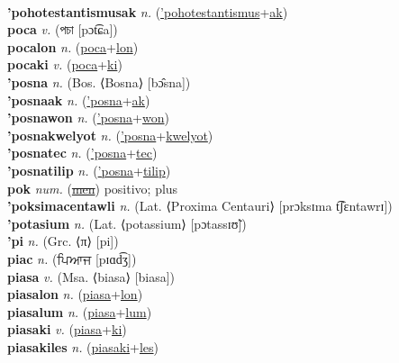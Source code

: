  \label{'pohotestantismuswon} \\
\textbf{'pohotestantismusak} \textit{n.} (\hyperref['pohotestantismus]{'pohotestantismus}+\hyperref[ak]{ak})
 \label{'pohotestantismusak} \\
\textbf{poca} \textit{v.} ({\bengali{}পচা} [pɔt͡ɕa])
 \label{poca} \\
\textbf{pocalon} \textit{n.} (\hyperref[poca]{poca}+\hyperref[lon]{lon})
 \label{pocalon} \\
\textbf{pocaki} \textit{v.} (\hyperref[poca]{poca}+\hyperref[ki]{ki})
 \label{pocaki} \\
\textbf{'posna} \textit{n.} (Bos. ⟨Bosna⟩ [bɔ̂sna])
 \label{'posna} \\
\textbf{'posnaak} \textit{n.} (\hyperref['posna]{'posna}+\hyperref[ak]{ak})
 \label{'posnaak} \\
\textbf{'posnawon} \textit{n.} (\hyperref['posna]{'posna}+\hyperref[won]{won})
 \label{'posnawon} \\
\textbf{'posnakwelyot} \textit{n.} (\hyperref['posna]{'posna}+\hyperref[kwelyot]{kwelyot})
 \label{'posnakwelyot} \\
\textbf{'posnatec} \textit{n.} (\hyperref['posna]{'posna}+\hyperref[tec]{tec})
 \label{'posnatec} \\
\textbf{'posnatilip} \textit{n.} (\hyperref['posna]{'posna}+\hyperref[tilip]{tilip})
 \label{'posnatilip} \\
\textbf{pok} \textit{num.} (\hyperref[men]{\sout{men}})
positivo; plus \label{pok} \\
\textbf{'poksimacentawli} \textit{n.} (Lat. ⟨Proxima Centauri⟩ [prɔksɪma t͡ʃɛntawrɪ])
 \label{'poksimacentawli} \\
\textbf{'potasium} \textit{n.} (Lat. ⟨potassium⟩ [pɔtassɪʊ̃])
 \label{'potasium} \\
\textbf{'pi} \textit{n.} (Grc. ⟨π⟩ [pi])
 \label{'pi} \\
\textbf{piac} \textit{n.} ({\gurmukhi{}ਪਿਆਜ} [pɪɑd͡ʒ])
 \label{piac} \\
\textbf{piasa} \textit{v.} (Msa. ⟨biasa⟩ [biasa])
 \label{piasa} \\
\textbf{piasalon} \textit{n.} (\hyperref[piasa]{piasa}+\hyperref[lon]{lon})
 \label{piasalon} \\
\textbf{piasalum} \textit{n.} (\hyperref[piasa]{piasa}+\hyperref[lum]{lum})
 \label{piasalum} \\
\textbf{piasaki} \textit{v.} (\hyperref[piasa]{piasa}+\hyperref[ki]{ki})
 \label{piasaki} \\
\textbf{piasakiles} \textit{n.} (\hyperref[piasaki]{piasaki}+\hyperref[les]{les})

